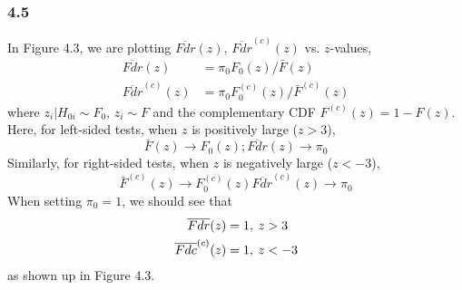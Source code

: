 \documentclass{article}\usepackage{graphicx, color}
\begin{document}
\subsubsection*{4.5}
In Figure 4.3, we are plotting $\overline{Fdr}(z)$, $\overline{Fdr}^{(c)}(z)$ vs. $z$-values,
\begin{displaymath}
\begin{split}
\overline{Fdr}(z) &= \pi_0F_0(z) / \bar{F}(z) \\
\overline{Fdr}^{(c)}(z) &= \pi_0F_0^{(c)}(z) / \bar{F}^{(c)}(z)
\end{split}
\end{displaymath}
where $z_i | H_{0i} \sim F_0$, $z_i \sim F$ and the complementary CDF
$F^{(c)}(z)= 1 - F(z)$. \newline
Here, for left-sided tests, when $z$ is positively large ($z>3$),
\begin{displaymath}
\bar{F}(z) \rightarrow F_0(z);
\overline{Fdr}(z) \rightarrow \pi_0
\end{displaymath}
Similarly, for right-sided tests, when $z$ is negatively large ($z<-3$),
\begin{displaymath}
\bar{F}^{(c)}(z) \rightarrow F_0^{(c)}(z)
\overline{Fdr}^{(c)}(z) \rightarrow \pi_0
\end{displaymath}
When setting $\pi_0 = 1$, we should see that
\begin{displaymath}
\begin{split}
\overline{Fdr}(z) = 1, &\hspace{4 pt} z>3 \\
\overline{Fdc}^{(c)}(z) = 1, &\hspace{4 pt} z<-3 
\end{split}
\end{displaymath}
as shown up in Figure 4.3.
\end{document}
